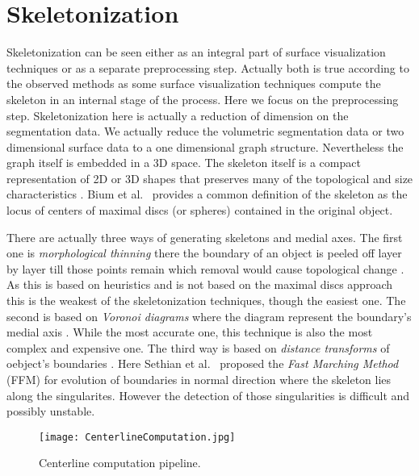 \section{Skeletonization}

Skeletonization can be seen either as an integral part of surface visualization techniques or as a separate preprocessing step. Actually both is true according to the observed methods as some surface visualization techniques compute the skeleton in an internal stage of the process. Here we focus on the preprocessing step.
Skeletonization here is actually a reduction of dimension on the segmentation data. We actually reduce the volumetric segmentation data or two dimensional surface data to a one dimensional graph structure. Nevertheless the graph itself is embedded in a 3D space.
The skeleton itself is a compact representation of 2D or 3D shapes that preserves many of the topological and size characteristics \cite{alexandru2002augmented}. Bium et al.~\cite{bium1964transformation} provides a common definition of the skeleton as the locus of centers of maximal discs (or spheres) contained in the original object.

There are actually three ways of generating skeletons and medial axes. The first one is \emph{morphological thinning} there the boundary of an object is peeled off layer by layer till those points remain which removal would cause topological change \cite{alexandru2002augmented}. As this is based on heuristics and is not based on the maximal discs approach this is the weakest of the skeletonization techniques, though the easiest one. The second is based on \emph{Voronoi diagrams} where the diagram represent the boundary's medial axis \cite{alexandru2002augmented}. While the most accurate one, this technique is also the most complex and expensive one. The third way is based on \emph{distance transforms} of oebject's boundaries \cite{alexandru2002augmented}. Here Sethian et al.~\cite{sethian1996fast} proposed the \emph{Fast Marching Method} (FFM) for evolution of boundaries in normal direction where the skeleton lies along the singularites. However the detection of those singularities is difficult and possibly unstable.

\begin{figure}[h]
	\centering
	\texttt{[image: CenterlineComputation.jpg]} \\
	\caption{Centerline computation pipeline.}
	\cite{alexandru2002augmented}
	\label{fig:CenterlineComputation}
\end{figure} 

